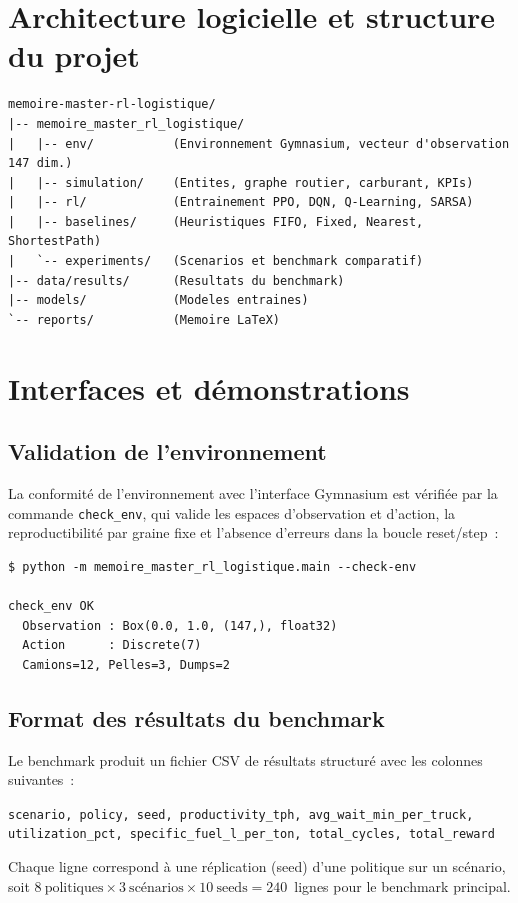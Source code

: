 \documentclass[11pt,a4paper]{report}
\begin{document}
\chapter{Architecture logicielle et structure du projet}
\label{ann:architecture}

\begin{verbatim}
memoire-master-rl-logistique/
|-- memoire_master_rl_logistique/
|   |-- env/           (Environnement Gymnasium, vecteur d'observation 147 dim.)
|   |-- simulation/    (Entites, graphe routier, carburant, KPIs)
|   |-- rl/            (Entrainement PPO, DQN, Q-Learning, SARSA)
|   |-- baselines/     (Heuristiques FIFO, Fixed, Nearest, ShortestPath)
|   `-- experiments/   (Scenarios et benchmark comparatif)
|-- data/results/      (Resultats du benchmark)
|-- models/            (Modeles entraines)
`-- reports/           (Memoire LaTeX)
\end{verbatim}

\chapter{Interfaces et démonstrations}
\label{ann:interfaces}

\section*{Validation de l'environnement}

La conformité de l'environnement avec l'interface Gymnasium est vérifiée par la commande \texttt{check\_env}, qui valide les espaces d'observation et d'action, la reproductibilité par graine fixe et l'absence d'erreurs dans la boucle reset/step~:

\begin{lstlisting}
$ python -m memoire_master_rl_logistique.main --check-env

check_env OK
  Observation : Box(0.0, 1.0, (147,), float32)
  Action      : Discrete(7)
  Camions=12, Pelles=3, Dumps=2
\end{lstlisting}

\section*{Format des résultats du benchmark}

Le benchmark produit un fichier CSV de résultats structuré avec les colonnes suivantes~:

\begin{center}
\texttt{scenario, policy, seed, productivity\_tph, avg\_wait\_min\_per\_truck,}\\
\texttt{utilization\_pct, specific\_fuel\_l\_per\_ton, total\_cycles, total\_reward}
\end{center}

Chaque ligne correspond à une réplication (seed) d'une politique sur un scénario, soit $8~\text{politiques} \times 3~\text{scénarios} \times 10~\text{seeds} = 240$~lignes pour le benchmark principal.

\end{document}
